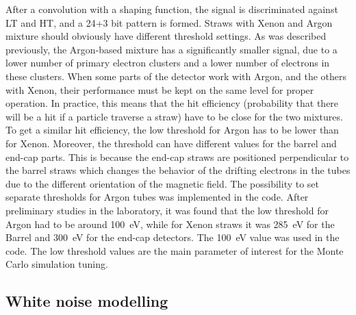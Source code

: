 After a convolution with a shaping function, the signal is discriminated against LT and HT, and a 24+3 bit pattern is formed.
Straws with Xenon and Argon mixture should obviously have different threshold settings.
As was described previously, the Argon-based mixture has a significantly smaller signal, due to a lower number of primary electron clusters and a lower number of electrons in these clusters.
When some parts of the detector work with Argon, and the others with Xenon, their performance must be kept on the same level for
proper operation. In practice, this means that the hit efficiency (probability that there will be a hit if a particle traverse a straw) have to be close for the two mixtures. 
To get a similar hit efficiency, the low threshold for Argon has to be lower than for Xenon.
Moreover, the threshold can have different values for the barrel and end-cap parts. This is because the end-cap straws are positioned perpendicular to the barrel straws
which changes the behavior of the drifting electrons in the tubes due to the different orientation of the magnetic field.
The possibility to set separate thresholds for Argon tubes was implemented in the code.
After preliminary studies in the laboratory, it was found that the low threshold for Argon had to be around 100~eV, 
while for Xenon straws it was 285~eV for the Barrel and 300~eV for the end-cap detectors. The 100~eV value was used in the code.
The low threshold values are the main parameter of interest for the Monte Carlo simulation tuning.

\subsection{White noise modelling}

